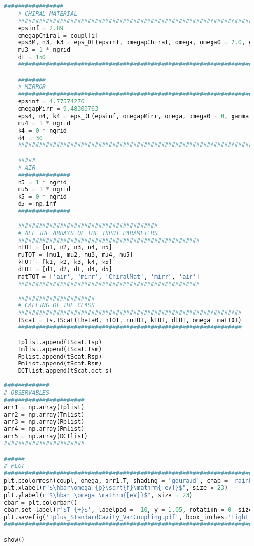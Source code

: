 \documentclass[aps,prl,10pt,onecolumn,superscriptaddress]{revtex4-2}
\begin{document}
\begin{lstlisting}[language=Python, caption=Script for Figure 10 $(a)$]
    #################
    # CHIRAL MATERIAL
    ##########################################################################################
    epsinf = 2.89
    omegapChiral = coupl[i]
    eps3M, n3, k3 = eps_DL(epsinf, omegapChiral, omega, omega0 = 2.0, gamma = 0.05, k0 = 1e-3)
    mu3 = 1 * ngrid
    dL = 150
    ########################################################################################## 

    ########
    # MIRROR
    ########################################################################################
    epsinf = 4.77574276
    omegapMirr = 9.48300763
    eps4, n4, k4 = eps_DL(epsinf, omegapMirr, omega, omega0 = 0, gamma = 0.17486845, k0 = 0)
    mu4 = 1 * ngrid
    k4 = 0 * ngrid
    d4 = 30
    ######################################################################################## 

    #####
    # AIR
    ###############
    n5 = 1 * ngrid
    mu5 = 1 * ngrid
    k5 = 0 * ngrid
    d5 = np.inf
    ###############
    
    ########################################
    # ALL THE ARRAYS OF THE INPUT PARAMETERS
    ####################################################
    nTOT = [n1, n2, n3, n4, n5]
    muTOT = [mu1, mu2, mu3, mu4, mu5]
    kTOT = [k1, k2, k3, k4, k5] 
    dTOT = [d1, d2, dL, d4, d5] 
    matTOT = ['air', 'mirr', 'ChiralMat', 'mirr', 'air']
    ####################################################
    
    ######################
    # CALLING OF THE CLASS
    ################################################################
    tScat = ts.TScat(theta0, nTOT, muTOT, kTOT, dTOT, omega, matTOT)  
    ################################################################
    
    Tplist.append(tScat.Tsp)
    Tmlist.append(tScat.Tsm)
    Rplist.append(tScat.Rsp)
    Rmlist.append(tScat.Rsm)
    DCTlist.append(tScat.dct_s)
    
#############
# OBSERVABLES
#######################    
arr1 = np.array(Tplist)
arr2 = np.array(Tmlist)
arr3 = np.array(Rplist)
arr4 = np.array(Rmlist)
arr5 = np.array(DCTlist)
#######################

######
# PLOT
############################################################################
plt.pcolormesh(coupl, omega, arr1.T, shading = 'gouraud', cmap = 'rainbow') 
plt.xlabel(r"$\hbar\omega_{p}\sqrt{f}\mathrm{[eV]}$", size = 23)
plt.ylabel(r"$\hbar \omega \mathrm{[eV]}$", size = 23)
cbar = plt.colorbar()
cbar.set_label(r'$T_{+}$', labelpad = -10, y = 1.05, rotation = 0, size = 14)
plt.savefig('Tplus_StandardCavity_VarCoupling.pdf', bbox_inches='tight')
############################################################################

show() 
\end{lstlisting}
\end{document}

